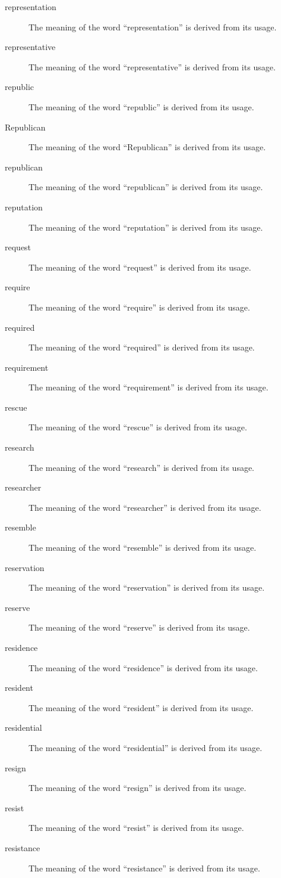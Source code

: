\documentclass[12pt, letterpaper]{memoir}
\begin{document}
\begin{description}
\item[representation] The meaning of the word ``representation'' is derived from its usage.
\item[representative] The meaning of the word ``representative'' is derived from its usage.
\item[republic] The meaning of the word ``republic'' is derived from its usage.
\item[Republican] The meaning of the word ``Republican'' is derived from its usage.
\item[republican] The meaning of the word ``republican'' is derived from its usage.
\item[reputation] The meaning of the word ``reputation'' is derived from its usage.
\item[request] The meaning of the word ``request'' is derived from its usage.
\item[require] The meaning of the word ``require'' is derived from its usage.
\item[required] The meaning of the word ``required'' is derived from its usage.
\item[requirement] The meaning of the word ``requirement'' is derived from its usage.
\item[rescue] The meaning of the word ``rescue'' is derived from its usage.
\item[research] The meaning of the word ``research'' is derived from its usage.
\item[researcher] The meaning of the word ``researcher'' is derived from its usage.
\item[resemble] The meaning of the word ``resemble'' is derived from its usage.
\item[reservation] The meaning of the word ``reservation'' is derived from its usage.
\item[reserve] The meaning of the word ``reserve'' is derived from its usage.
\item[residence] The meaning of the word ``residence'' is derived from its usage.
\item[resident] The meaning of the word ``resident'' is derived from its usage.
\item[residential] The meaning of the word ``residential'' is derived from its usage.
\item[resign] The meaning of the word ``resign'' is derived from its usage.
\item[resist] The meaning of the word ``resist'' is derived from its usage.
\item[resistance] The meaning of the word ``resistance'' is derived from its usage.

\end{description}
\end{document}
